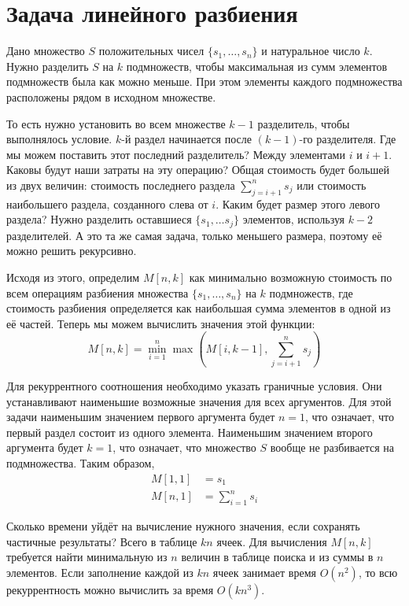\documentclass[14pt,openany]{book}
\begin{document}
\section{Задача линейного разбиения}

Дано множество $S$ положительных чисел $\{s_1, \ldots , s_n\}$ и натуральное число $k$.
Нужно разделить $S$ на $k$ подмножеств, чтобы максимальная из сумм элементов подмножеств была 
как можно меньше. При этом элементы каждого подмножества расположены рядом в исходном множестве.

То есть нужно установить во всем множестве $k-1$ разделитель, чтобы выполнялось условие.
$k$-й раздел начинается после $(k-1)$-го разделителя. Где мы можем поставить этот последний
разделитель? Между элементами $i$ и $i+1$. Каковы будут наши затраты на эту операцию?
Общая стоимость будет большей из двух величин: стоимость последнего раздела $\sum_{j=i+1}^{n}s_j$
или стоимость наибольшего раздела, созданного слева от $i$. Каким будет размер этого левого раздела?
Нужно разделить оставшиеся $\{s_1,\ldots s_j\}$ элементов, используя $k-2$ разделителей.
А это та же самая задача, только меньшего размера, поэтому её можно решить рекурсивно.

Исходя из этого, определим $M[n, k]$ как минимально возможную стоимость по всем операциям
разбиения множества $\{s_1, \ldots , s_n\}$ на $k$ подмножеств, где стоимость разбиения
определяется как наибольшая сумма элементов в одной из её частей. Теперь мы можем вычислить
значения этой функции:
$$ M[n,k] = \min_{i=1}^{n}\max\left(M[i,k-1], \sum_{j=i+1}^{n}s_j\right)$$

Для рекуррентного соотношения необходимо указать граничные условия. Они устанавливают
наименьшие возможные значения для всех аргументов. Для этой задачи наименьшим значением
первого аргумента будет $n=1$, что означает, что первый раздел состоит из одного элемента.
Наименьшим значением второго аргумента будет $k=1$, что означает, что множество $S$
вообще не разбивается на подмножества. Таким образом,
\begin{align*}
M[1,1] &= s_1 \\
M[n,1] &= \sum_{i=1}^{n}s_i
\end{align*}

Сколько времени уйдёт на вычисление нужного значения, если сохранять частичные результаты?
Всего в таблице $kn$ ячеек. Для вычисления $M[n,k]$ требуется найти минимальную из $n$ величин
в таблице поиска и из суммы в $n$ элементов. Если заполнение каждой из $kn$ ячеек занимает время 
$O(n^2)$, то всю рекуррентность можно вычислить за время $O(kn^3)$.
\end{document}
